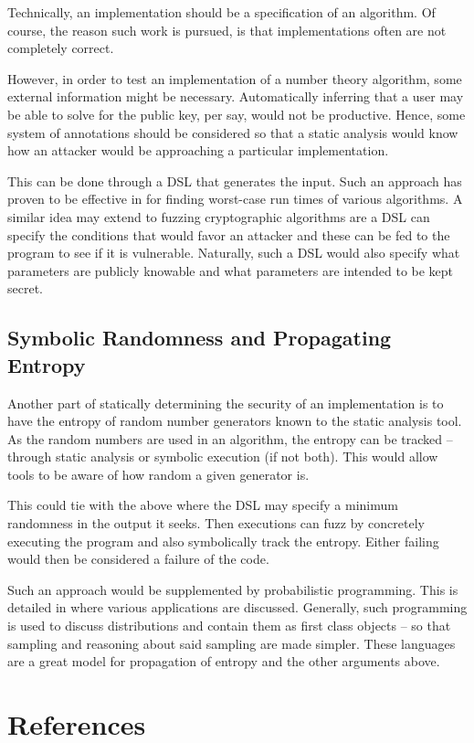 \documentclass[letterpaper,twocolumn,10pt]{article}
\begin{document}
Technically, an implementation should be a specification of an algorithm. Of course, the reason such work is pursued,
is that implementations often are not completely correct.

However, in order to test an implementation of a number theory algorithm, some external information might be necessary.
Automatically inferring that a user may be able to solve for the public key, per say, would not be productive.
Hence, some system of annotations should be considered so that a static analysis would know how an attacker would be
approaching a particular implementation.

This can be done through a DSL that generates the input. Such an approach has proven to be effective in \cite{singularity}
for finding worst-case run times of various algorithms. A similar idea may extend to fuzzing cryptographic algorithms
are a DSL can specify the conditions that would favor an attacker and these can be fed to the program to see if it is
vulnerable. Naturally, such a DSL would also specify what parameters are publicly knowable and what parameters are intended
to be kept secret.

\subsection{Symbolic Randomness and Propagating Entropy}

Another part of statically determining the security of an implementation is to have the entropy of random number generators
known to the static analysis tool. As the random numbers are used in an algorithm, the entropy can be tracked -- through
static analysis or symbolic execution (if not both). This would allow tools to be aware of how random a given generator
is.

This could tie with the above where the DSL may specify a minimum randomness in the output it seeks. Then executions can
fuzz by concretely executing the program and also symbolically track the entropy. Either failing would then be considered
a failure of the code.

Such an approach would be supplemented by probabilistic programming. This is detailed in \cite{probProg} where various
applications are discussed. Generally, such programming is used to discuss distributions and contain them as first
class objects -- so that sampling and reasoning about said sampling are made simpler. These languages are a great
model for propagation of entropy and the other arguments above.

\section{References}


\end{document}
